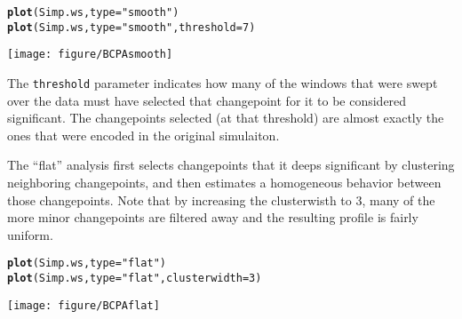\documentclass[10pt]{article}\usepackage[]{graphicx}\usepackage[]{color}
\makeatletter
\newcommand{\hlnum}[1]{\textcolor[rgb]{0.686,0.059,0.569}{#1}}%
\newcommand{\hlstr}[1]{\textcolor[rgb]{0.192,0.494,0.8}{#1}}%
\newcommand{\hlstd}[1]{\textcolor[rgb]{0.345,0.345,0.345}{#1}}%
\newcommand{\hlkwc}[1]{\textcolor[rgb]{0.333,0.667,0.333}{#1}}%
\newcommand{\hlkwd}[1]{\textcolor[rgb]{0.737,0.353,0.396}{\textbf{#1}}}%
\newenvironment{kframe}{%
 \def\at@end@of@kframe{}%
 \ifinner\ifhmode%
  \def\at@end@of@kframe{\end{minipage}}%
  \begin{minipage}{\columnwidth}%
 \fi\fi%
 \def\FrameCommand##1{\hskip\@totalleftmargin \hskip-\fboxsep
 \colorbox{shadecolor}{##1}\hskip-\fboxsep
     \hskip-\linewidth \hskip-\@totalleftmargin \hskip\columnwidth}%
 \MakeFramed {\advance\hsize-\width
   \@totalleftmargin\z@ \linewidth\hsize
   \@setminipage}}%
 {\par\unskip\endMakeFramed%
 \at@end@of@kframe}
\newenvironment{knitrout}{}{} %
\makeatother
\begin{document}
\begin{knitrout}\small
{}\color{fgcolor}\begin{kframe}
\begin{alltt}
\hlkwd{plot}\hlstd{(Simp.ws,} \hlkwc{type} \hlstd{=} \hlstr{"smooth"}\hlstd{)}
\hlkwd{plot}\hlstd{(Simp.ws,} \hlkwc{type} \hlstd{=} \hlstr{"smooth"}\hlstd{,} \hlkwc{threshold} \hlstd{=} \hlnum{7}\hlstd{)}
\end{alltt}
\end{kframe}
\texttt{[image: figure/BCPAsmooth]} 

\end{knitrout}



The \texttt{threshold} parameter indicates how many of the windows that were swept over the data must have selected that changepoint for it to be considered significant.  The changepoints selected (at that threshold) are almost exactly the ones that were encoded in the original simulaiton. 

The ``flat'' analysis first selects changepoints that it deeps significant by clustering neighboring changepoints, and then estimates a homogeneous behavior between those changepoints.  Note that by increasing the clusterwisth to 3, many of the more minor changepoints are filtered away and the resulting profile is fairly uniform.

\begin{knitrout}\small
{}\color{fgcolor}\begin{kframe}
\begin{alltt}
\hlkwd{plot}\hlstd{(Simp.ws,} \hlkwc{type} \hlstd{=} \hlstr{"flat"}\hlstd{)}
\hlkwd{plot}\hlstd{(Simp.ws,} \hlkwc{type} \hlstd{=} \hlstr{"flat"}\hlstd{,} \hlkwc{clusterwidth} \hlstd{=} \hlnum{3}\hlstd{)}
\end{alltt}
\end{kframe}
\texttt{[image: figure/BCPAflat]} 

\end{knitrout}
\end{document}
